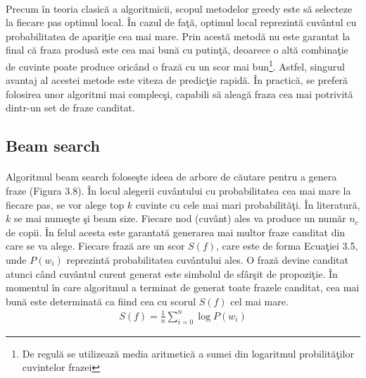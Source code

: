\paragraph{}
Precum \^ in teoria clasic\u a a algoritmicii, scopul metodelor greedy este s\u a selecteze la fiecare pas optimul local. \^ In cazul de fa\c t\u a, optimul local reprezint\u a cuv\^ antul cu probabilitatea de apari\c tie cea mai mare. Prin acest\u a metod\u a nu este garantat la final c\u a fraza produs\u a este cea mai bun\u a cu putin\c t\u a, deoarece o alt\u a combina\c tie de cuvinte poate produce oric\^ and o fraz\u a cu un scor mai bun\footnote{De regul\u a se utilizeaz\u a media aritmetic\u a a sumei din logaritmul probilit\u a\c tilor cuvintelor frazei}. Astfel, singurul avantaj al acestei metode este viteza de predic\c tie rapid\u a. \^ In practic\u a, se prefer\u a folosirea unor algoritmi mai complec\c si, capabili s\u a aleag\u a fraza cea mai potrivit\u a dintr-un set de fraze canditat.

\subsection{Beam search}

\paragraph{}
Algoritmul beam search \cite{norvig1992paradigms} folose\c ste ideea de arbore de c\u autare pentru a genera fraze (Figura 3.8). \^ In locul alegerii cuv\^ antului cu probabilitatea cea mai mare la fiecare pas, se vor alege top \(k\) cuvinte cu cele mai mari probabilit\u a\c ti. \^ In literatur\u a, \(k\) se mai nume\c ste \c si beam size. Fiecare nod (cuv\^ ant) ales va produce un num\u ar \(n_c\) de copii. \^ In felul acesta este garantat\u a generarea mai multor fraze canditat din care se va alege. Fiecare fraz\u a are un scor \(S(f)\), care este de forma Ecua\c tiei 3.5, unde \(P(w_{i})\) reprezint\u a probabilitatea cuv\^ antului ales. O fraz\u a devine canditat atunci c\^ and cuv\^ antul curent generat este simbolul de sf\^ ar\c sit de propozi\c tie. \^ In momentul \^ in care algoritmul a terminat de generat toate frazele canditat, cea mai bun\u a este determinat\u a ca fiind cea cu scorul \(S(f)\) cel mai mare.\\

\begin{equation}
\begin{split}
S(f) = \frac{1}{n} \sum_{i=0}^{n} \log P(w_{i})
\end{split}
\end{equation}

